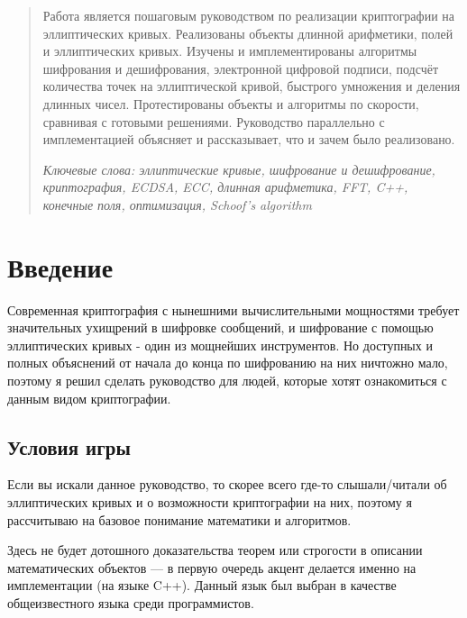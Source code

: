 
\begin{abstract}
  Работа является пошаговым руководством по реализации криптографии на эллиптических кривых. Реализованы объекты длинной арифметики, полей и эллиптических кривых. Изучены и имплементированы алгоритмы шифрования и дешифрования, электронной цифровой подписи, подсчёт количества точек на эллиптической кривой, быстрого умножения и деления длинных чисел. Протестированы объекты и алгоритмы по скорости, сравнивая с готовыми решениями. Руководство параллельно с имплементацией объясняет и рассказывает, что и зачем было реализовано.

  \textit{Ключевые слова: эллиптические кривые, шифрование и дешифрование, криптография, ECDSA, ECC, длинная арифметика, FFT, C++, конечные поля, оптимизация, Schoof's algorithm}
\end{abstract}

\section{Введение}
Современная криптография с нынешними вычислительными мощностями требует значительных ухищрений в шифровке сообщений, и шифрование с помощью эллиптических кривых - один из мощнейших инструментов. Но доступных и полных объяснений от начала до конца по шифрованию на них ничтожно мало, поэтому я решил сделать руководство для людей, которые хотят ознакомиться с данным видом криптографии.

\subsection{Условия игры}
 Если вы искали данное руководство, то скорее всего где-то слышали/читали об эллиптических кривых и о возможности криптографии на них, поэтому я рассчитываю на базовое понимание математики и алгоритмов.

Здесь не будет дотошного доказательства теорем или строгости в описании математических объектов --- в первую очередь акцент делается именно на имплементации (на языке C++). Данный язык был выбран в качестве общеизвестного языка среди программистов.
